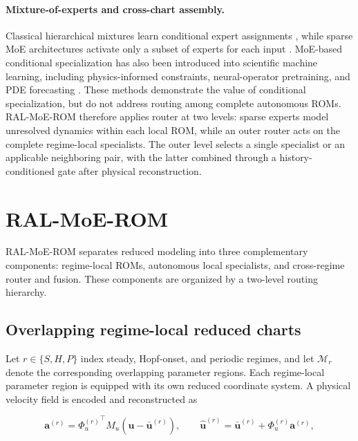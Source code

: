 \documentclass{article}
\begin{document}
\paragraph{Mixture-of-experts and cross-chart assembly.}
Classical hierarchical mixtures learn conditional expert assignments \citep{jacobs1991,jordan1994}, while sparse MoE architectures activate only a subset of experts for each input \citep{shazeer2017,fedus2022}. MoE-based conditional specialization has also been introduced into scientific machine learning, including physics-informed constraints, 
neural-operator pretraining, and PDE forecasting
\citep{ICLR2024_9aeda582,NEURIPS2024_b83fae17,
NEURIPS2025_2d23a999,ICLR2026_754612bd}. These methods demonstrate the value of conditional specialization, but do
not address routing among complete autonomous ROMs. RAL-MoE-ROM therefore applies router  at two levels: sparse experts model unresolved dynamics within each local ROM, while an outer router acts on the complete regime-local specialists. The outer level selects a single specialist or an
applicable neighboring pair, with the latter combined through a history-conditioned gate after physical reconstruction.



\section{RAL-MoE-ROM}
\label{sec:method}

RAL-MoE-ROM separates reduced modeling into three complementary components: regime-local ROMs, autonomous local specialists, and cross-regime router and fusion. These components are organized by a two-level routing hierarchy. 

\subsection{Overlapping regime-local reduced charts}

Let $r\in\{S,H,P\}$ index steady, Hopf-onset, and periodic regimes, and let $\mathcal M_r$ denote the corresponding overlapping parameter regions. Each regime-local parameter region is equipped with its own reduced coordinate system. A physical velocity field is encoded and reconstructed as


\begin{equation}
  \bm a^{(r)}={\Phi_u^{(r)}}^{\top}M_u(\bm u-\bar{\bm u}^{(r)}),\qquad
  \widehat{\bm u}^{(r)}=\bar{\bm u}^{(r)}+\Phi_u^{(r)}\bm a^{(r)},
  \label{eq:main_chart}
\end{equation}
\end{document}
